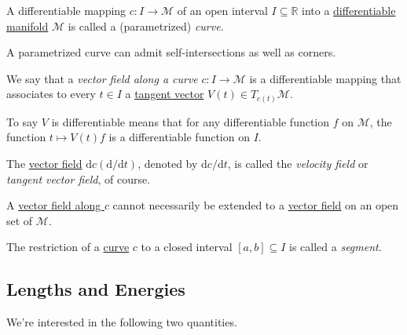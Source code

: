 \begin{definition}[Curve]\label{def:curve}
	A differentiable mapping \(c\colon I \to \mathcal{M} \) of an open interval \(I \subseteq \mathbb{R} \) into a \hyperref[def:smooth-manifold]{differentiable manifold} \(\mathcal{M} \) is called a (parametrized) \emph{curve}.
\end{definition}

\begin{note}
	A parametrized curve can admit self-intersections as well as corners.
	\begin{center}
	\end{center}
\end{note}

\begin{definition}\label{def:vector-field-curve}
	We say that a \emph{vector field along a curve} \(c\colon I \to \mathcal{M} \) is a differentiable mapping that associates to every \(t\in I\) a \hyperref[def:tangent-vector]{tangent vector} \(V(t)\in T_{c(t)}\mathcal{M} \).
\end{definition}

To say \(V\) is differentiable means that for any differentiable function \(f\) on \(\mathcal{M} \), the function \(t \mapsto V(t) f\) is a differentiable function on \(I\).

\begin{eg}
	The \hyperref[def:vector-field-curve]{vector field} \(\mathrm{d} c (\mathrm{d} / \mathrm{d} t)\), denoted by \(\mathrm{d} c / \mathrm{d} t\), is called the \emph{velocity field} or \emph{tangent vector field}, of course.
\end{eg}

\begin{remark}
	A \hyperref[def:vector-field-curve]{vector field along \(c\)} cannot necessarily be extended to a \hyperref[def:vector-field]{vector field} on an open set of \(\mathcal{M} \).
\end{remark}

\begin{notation}[Segment]
	The restriction of a \hyperref[def:curve]{curve} \(c\) to a closed interval \([a, b] \subseteq I\) is called a \emph{segment}.
\end{notation}

\subsection{Lengths and Energies}
We're interested in the following two quantities.

